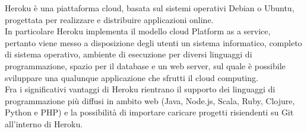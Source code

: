 		Heroku è una piattaforma cloud, basata sul sistemi operativi Debian o Ubuntu, progettata per realizzare e distribuire applicazioni online. \\
		In particolare Heroku implementa il modello cloud Platform as a service, pertanto viene messo a disposizione degli utenti un sistema informatico, completo di sistema operativo, ambiente di esecuzione per diversi linguaggi di programmazione, spazio per il database e un web server, sul quale è possibile sviluppare una qualunque applicazione che sfrutti il cloud computing.\\
		Fra i significativi vantaggi di Heroku rientrano il supporto dei linguaggi di programmazione più diffusi in ambito web (Java, Node.js, Scala, Ruby, Clojure, Python e PHP) e la possibilità di importare caricare progetti risiendenti su Git all'interno di Heroku.
	
